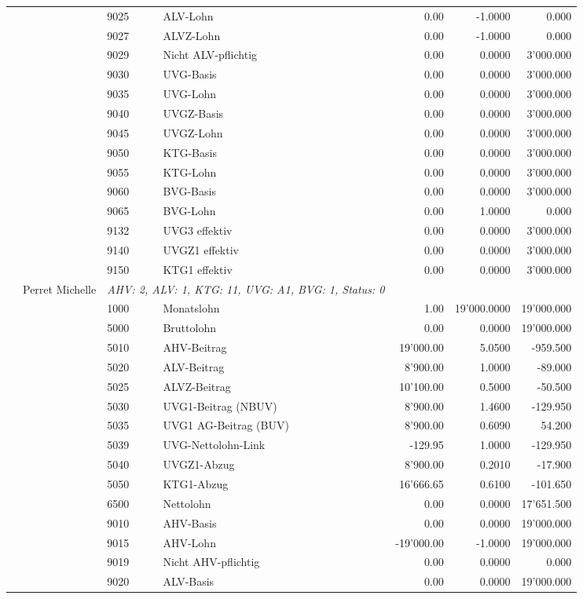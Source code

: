 \documentclass[15pt,a4paper]{article}
\begin{document}
\begin{longtable}{@{\extracolsep{\fill}}l l l l|r|r|r}
&&9025&ALV-Lohn&0.00&-1.0000&0.000\\
&&9027&ALVZ-Lohn&0.00&-1.0000&0.000\\
&&9029&Nicht ALV-pflichtig&0.00&0.0000&3'000.000\\
&&9030&UVG-Basis&0.00&0.0000&3'000.000\\
&&9035&UVG-Lohn&0.00&0.0000&3'000.000\\
&&9040&UVGZ-Basis&0.00&0.0000&3'000.000\\
&&9045&UVGZ-Lohn&0.00&0.0000&3'000.000\\
&&9050&KTG-Basis&0.00&0.0000&3'000.000\\
&&9055&KTG-Lohn&0.00&0.0000&3'000.000\\
&&9060&BVG-Basis&0.00&0.0000&3'000.000\\
&&9065&BVG-Lohn&0.00&1.0000&0.000\\
&&9132&UVG3 effektiv&0.00&0.0000&3'000.000\\
&&9140&UVGZ1 effektiv&0.00&0.0000&3'000.000\\
&&9150&KTG1 effektiv&0.00&0.0000&3'000.000\\
\pagebreak
29&Perret Michelle&\multicolumn{2}{l|}{\small\emph{AHV: 2, ALV: 1, KTG: 11, UVG: A1, BVG: 1, Status: 0}}&& \\
&&1000&Monatslohn&1.00&19'000.0000&19'000.000\\
&&5000&Bruttolohn&0.00&0.0000&19'000.000\\
&&5010&AHV-Beitrag&19'000.00&5.0500&-959.500\\
&&5020&ALV-Beitrag&8'900.00&1.0000&-89.000\\
&&5025&ALVZ-Beitrag&10'100.00&0.5000&-50.500\\
&&5030&UVG1-Beitrag (NBUV)&8'900.00&1.4600&-129.950\\
&&5035&UVG1 AG-Beitrag (BUV)&8'900.00&0.6090&54.200\\
&&5039&UVG-Nettolohn-Link&-129.95&1.0000&-129.950\\
&&5040&UVGZ1-Abzug&8'900.00&0.2010&-17.900\\
&&5050&KTG1-Abzug&16'666.65&0.6100&-101.650\\
&&6500&Nettolohn&0.00&0.0000&17'651.500\\
&&9010&AHV-Basis&0.00&0.0000&19'000.000\\
&&9015&AHV-Lohn&-19'000.00&-1.0000&19'000.000\\
&&9019&Nicht AHV-pflichtig&0.00&0.0000&0.000\\
&&9020&ALV-Basis&0.00&0.0000&19'000.000\\

\end{longtable}
\end{document}
